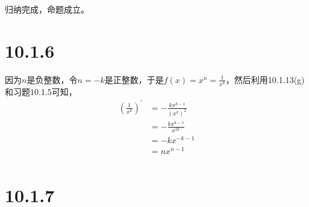 \documentclass{article}
\begin{document}
归纳完成，命题成立。

\section*{10.1.6}

因为$n$是负整数，令$n=-k$是正整数，于是$f(x) = x^n = \frac{1}{x^{k}}$，然后利用10.1.13(g)
和习题10.1.5可知，
\begin{align*}
  (\frac{1}{x^{k}})^\prime & = - \frac{kx^{k-1}}{(x^{k})^2} \\
                           & = - \frac{kx^{k-1}}{x^{2k}}    \\
                           & = - kx^{-k-1}                  \\
                           & = nx^{n-1}                     \\
\end{align*}

\section*{10.1.7}
\end{document}
